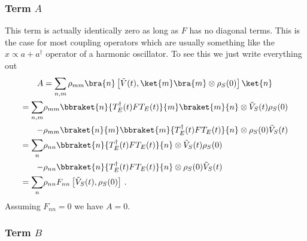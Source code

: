 \subsubsection{Term $A$}

This term is actually identically zero as long as $F$ has no diagonal terms.
This is the case for most coupling operators which are usually something like the $x \propto a + a^\dagger$ operator of a harmonic oscillator.
To see this we just write everything out
\begin{align}
A
&= \sum_{n,m} \rho_{mm} \bra{n} \left[ \tilde{V}(t), \ket{m}\bra{m}\otimes \rho_S(0) \right] \ket{n} \\
= \sum_{n,m} &\rho_{mm}
\bbraket{n}{T^\dagger_E(t) F T_E(t)}{m}\braket{m}{n}
\otimes \tilde{V}_S(t) \rho_S(0) \nonumber \\
- &\rho_{mm} \braket{n}{m} \bbraket{m}{T_E^\dagger(t) F T_E(t)}{n} \otimes \rho_S(0) \tilde{V}_S(t) \\
= \sum_n &\rho_{nn} \bbraket{n}{T_E^\dagger(t) F T_E(t)}{n} \otimes \tilde{V}_S(t) \rho_S(0) \nonumber \\
- &\rho_{nn} \bbraket{n}{T_E^\dagger(t) F T_E(t)}{n} \otimes \rho_S(0) \tilde{V}_S(t) \\
= \sum_n &\rho_{nn} F_{nn} \left[ \tilde{V}_S(t), \rho_S(0) \right] \, .
\end{align}
Assuming $F_{nn}=0$ we have $A = 0$.


\subsubsection{Term $B$}

